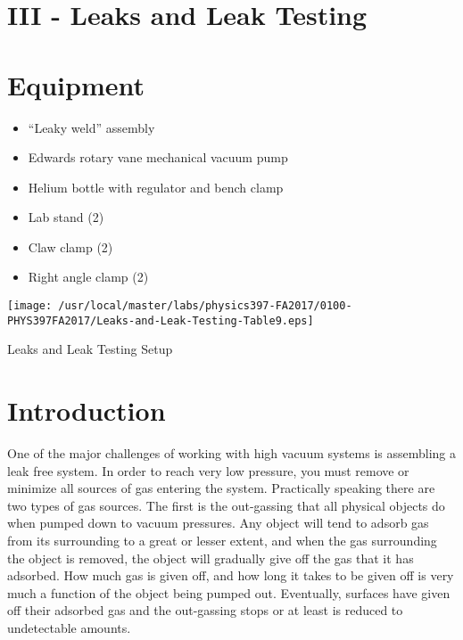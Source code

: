 \section{III - Leaks and Leak Testing}

\section{Equipment}

\begin{minipage}[t]{0.5\textwidth}
\begin{itemize}[noitemsep]
\item ``Leaky weld'' assembly
\item Edwards rotary vane mechanical vacuum pump
\item Helium bottle with regulator and bench clamp
\end{itemize}
\end{minipage}
\begin{minipage}[t]{0.5\textwidth}
\begin{itemize}[noitemsep]
\item Lab stand (2)
\item Claw clamp (2)
\item Right angle clamp (2)
\end{itemize}
\end{minipage}

\begin{marginfigure}
\texttt{[image: /usr/local/master/labs/physics397-FA2017/0100-PHYS397FA2017/Leaks-and-Leak-Testing-Table9.eps]}
\caption{Leaks and Leak Testing Setup}
\label{fig:VACsetup3}
\end{marginfigure}

\section{Introduction}

One of the major challenges of working with high vacuum systems is assembling a leak free system. In order to reach very low pressure, you must remove or minimize all sources of gas entering the system. Practically speaking there are two types of gas sources. The first is the out-gassing that all physical objects do when pumped down to vacuum pressures. Any object will tend to adsorb gas from its surrounding to a great or lesser extent, and when the gas surrounding the object is removed, the object will gradually give off the gas that it has adsorbed. How much gas is given off, and how long it takes to be given off is very much a function of the object being pumped out. Eventually, surfaces have given off their adsorbed gas and the out-gassing stops or at least is reduced to undetectable amounts.

